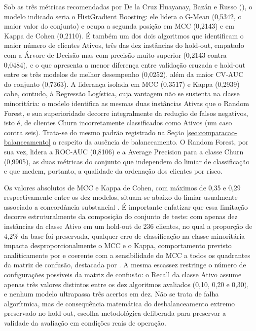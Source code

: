 Sob as três métricas recomendadas por De la Cruz Huayanay, Bazán e Russo (\citeyear{delacruz2025}), o modelo indicado seria o HistGradient Boosting: ele lidera o G-Mean (0,5342, o maior valor do conjunto) e ocupa a segunda posição em MCC (0,2143) e em Kappa de Cohen (0,2110). É também um dos dois algoritmos que identificam o maior número de clientes Ativos, três das dez instâncias do hold-out, empatado com a Árvore de Decisão mas com precisão muito superior (0,2143 contra 0,0484), e o que apresenta a menor diferença entre validação cruzada e hold-out entre os três modelos de melhor desempenho (0,0252), além da maior CV-AUC do conjunto (0,7363). A liderança isolada em MCC (0,3517) e Kappa (0,2939) cabe, contudo, à Regressão Logística, cuja vantagem não se sustenta na classe minoritária: o modelo identifica as mesmas duas instâncias Ativas que o Random Forest, e sua superioridade decorre integralmente da redução de falsos negativos, isto é, de clientes Churn incorretamente classificados como Ativos (um caso contra seis). Trata-se do mesmo padrão registrado na Seção \ref{sec:comparacao-balanceamento} a respeito da ausência de balanceamento. O Random Forest, por sua vez, lidera a ROC-AUC (0,8106) e a Average Precision para a classe Churn (0,9905), as duas métricas do conjunto que independem do limiar de classificação e que medem, portanto, a qualidade da ordenação dos clientes por risco.

Os valores absolutos de MCC e Kappa de Cohen, com máximos de 0,35 e 0,29 respectivamente entre os dez modelos, situam-se abaixo do limiar usualmente associado a concordância substancial \cite{landis1977}. É importante enfatizar que essa limitação decorre estruturalmente da composição do conjunto de teste: com apenas dez instâncias da classe Ativo em um hold-out de 236 clientes, no qual a proporção de 4,2\% da base foi preservada, qualquer erro de classificação na classe minoritária impacta desproporcionalmente o MCC e o Kappa, comportamento previsto analiticamente por  e coerente com a sensibilidade do MCC a todos os quadrantes da matriz de confusão, destacada por . A mesma escassez restringe o número de configurações possíveis da matriz de confusão: o Recall da classe Ativo assume apenas três valores distintos entre os dez algoritmos avaliados (0,10, 0,20 e 0,30), e nenhum modelo ultrapassa três acertos em dez. Não se trata de falha algorítmica, mas de consequência matemática do desbalanceamento extremo preservado no hold-out, escolha metodológica deliberada para preservar a validade da avaliação em condições reais de operação.

